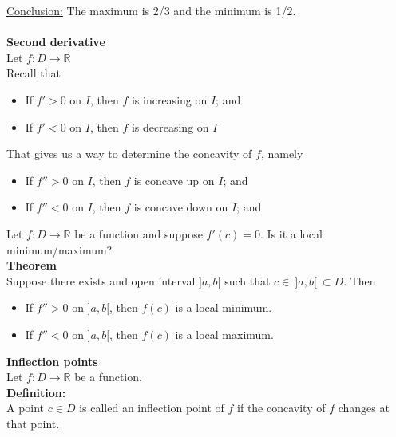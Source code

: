 \documentclass[]{article}
\begin{document}
	\underline{Conclusion:} The maximum is 2/3 and the minimum is 1/2.\\\\
	\large{\bf Second derivative}\\
	\normalsize
	Let $f:D\rightarrow\mathbb{R}$\\
	Recall that
	\begin{itemize}
		\item If $f'>0$ on $I$, then $f$ is increasing on $I$; and
		\item If $f'<0$ on $I$, then $f$ is decreasing on $I$
	\end{itemize}
	That gives us a way to determine the concavity of $f$, namely
	\begin{itemize}
		\item If $f''>0$ on $I$, then $f$ is concave up on $I$; and
		\item If $f''<0$ on $I$, then $f$ is concave down on $I$; and
	\end{itemize}
	Let $f:D\rightarrow\mathbb{R}$ be a function and suppose $f'(c)=0$. Is it a local minimum/maximum?\\
	{\bf Theorem}\\
	Suppose there exists and open interval $]a,b[$ such that $c\in~]a,b[~\subset D$. Then
	\begin{itemize}
		\item If $f''>0$ on $]a,b[$, then $f(c)$ is a local minimum.
		\item If $f''<0$ on $]a,b[$, then $f(c)$ is a local maximum.
	\end{itemize}
	\large{\bf Inflection points}\\
	\normalsize
	Let $f:D\rightarrow\mathbb{R}$ be a function.\\
	{\bf Definition:}\\
	A point $c\in D$ is called an inflection point of $f$ if the concavity of $f$ changes at that point.
\end{document}
